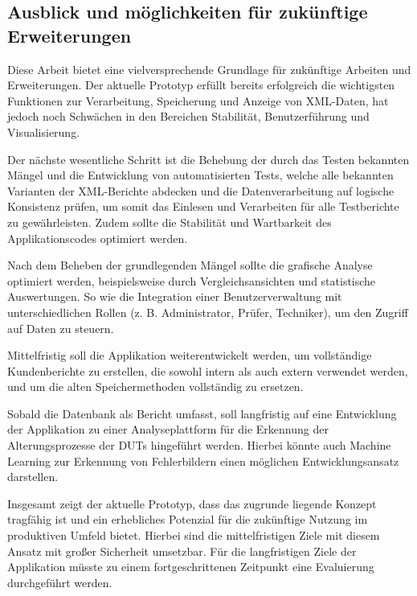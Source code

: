 \subsection{Ausblick und möglichkeiten für zukünftige Erweiterungen}
\label{subsec:moglichkeiten-fur-zukunftige-erweiterungen}

Diese Arbeit bietet eine vielversprechende Grundlage für zukünftige Arbeiten und Erweiterungen.
Der aktuelle Prototyp erfüllt bereits erfolgreich die wichtigsten Funktionen zur Verarbeitung, Speicherung und Anzeige von XML-Daten, hat jedoch noch Schwächen in den Bereichen Stabilität, Benutzerführung und Visualisierung.

Der nächste wesentliche Schritt ist die Behebung der durch das Testen bekannten Mängel und die Entwicklung von automatisierten Tests,
welche alle bekannten Varianten der XML-Berichte abdecken und die Datenverarbeitung auf logische Konsistenz prüfen, um somit das Einlesen und Verarbeiten für alle Testberichte zu gewährleisten.
Zudem sollte die Stabilität und Wartbarkeit des Applikationscodes optimiert werden.

Nach dem Beheben der grundlegenden Mängel sollte die grafische Analyse optimiert werden, beispielsweise durch Vergleichsansichten und statistische Auswertungen.
So wie die Integration einer Benutzerverwaltung mit unterschiedlichen Rollen (z. B. Administrator, Prüfer, Techniker), um den Zugriff auf Daten zu steuern.

Mittelfristig soll die Applikation weiterentwickelt werden, um vollständige Kundenberichte zu erstellen, die sowohl intern als auch extern verwendet werden, und um die alten Speichermethoden vollständig zu ersetzen.

Sobald die Datenbank als Bericht umfasst, soll langfristig auf eine Entwicklung der Applikation zu einer Analyseplattform für die Erkennung der Alterungsprozesse der \ac{DUTs} hingeführt werden. Hierbei könnte auch Machine Learning zur Erkennung von Fehlerbildern einen möglichen Entwicklungsansatz darstellen.

Insgesamt zeigt der aktuelle Prototyp, dass das zugrunde liegende Konzept tragfähig ist und ein erhebliches Potenzial für die zukünftige Nutzung im produktiven Umfeld bietet.
Hierbei sind die mittelfristigen Ziele mit diesem Ansatz mit großer Sicherheit umsetzbar.
Für die langfristigen Ziele der Applikation müsste zu einem fortgeschrittenen Zeitpunkt eine Evaluierung durchgeführt werden.


